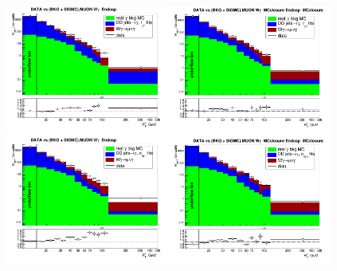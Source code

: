 \begin{figure}[htb]
  \begin{center}
   \includegraphics[width=0.48\textwidth]{../figs/figs_v11/MUON_WGamma/PrepareYields/c_DATAvsBkgPlusSigMCc_MUON_WGamma_TEMPL_CHISO_UNblind__Endcap__phoEt.png}\includegraphics[width=0.48\textwidth]{../figs/figs_v11/MUON_WGamma/PrepareYields/c_DATAvsBkgPlusSigMCc_MUON_WGamma_TEMPL_CHISO_UNblind_MCclosure__Endcap__phoEt_MCclosure.png}\\
\includegraphics[width=0.48\textwidth]{../figs/figs_v11/MUON_WGamma/PrepareYields/c_DATAvsBkgPlusSigMCc_MUON_WGamma_TEMPL_SIHIH_UNblind__Endcap__phoEt.png}\includegraphics[width=0.48\textwidth]{../figs/figs_v11/MUON_WGamma/PrepareYields/c_DATAvsBkgPlusSigMCc_MUON_WGamma_TEMPL_SIHIH_UNblind_MCclosure__Endcap__phoEt_MCclosure.png}

\end{center}
\end{figure}
